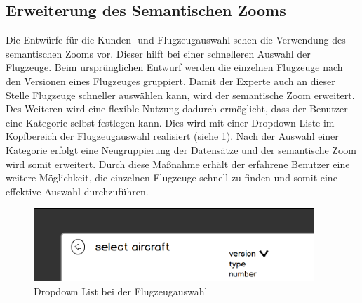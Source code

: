 \subsection{Erweiterung des Semantischen Zooms}
Die Entwürfe für die Kunden- und Flugzeugauswahl sehen die Verwendung des semantischen Zooms vor. Dieser hilft bei einer schnelleren Auswahl der Flugzeuge. Beim ursprünglichen Entwurf werden die einzelnen Flugzeuge nach den Versionen eines Flugzeuges gruppiert. Damit der Experte auch an dieser Stelle Flugzeuge schneller auswählen kann, wird der semantische Zoom erweitert. Des Weiteren wird eine flexible Nutzung dadurch ermöglicht, dass der Benutzer eine Kategorie selbst festlegen kann. Dies wird mit einer Dropdown Liste im Kopfbereich der Flugzeugauswahl realisiert (siehe \ref{dropdown}). Nach der Auswahl einer Kategorie erfolgt eine Neugruppierung der Datensätze und der semantische Zoom wird somit erweitert. Durch diese Maßnahme erhält der erfahrene Benutzer eine weitere Möglichkeit, die einzelnen Flugzeuge schnell zu finden und somit eine effektive Auswahl durchzuführen.
\begin{figure}[H]
\centering
\includegraphics[width=400px]{images/semanticZoom}
\caption{Dropdown List bei der Flugzeugauswahl}
\label{dropdown}
\end{figure}
